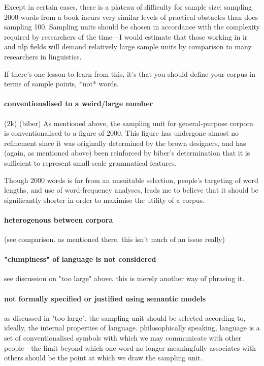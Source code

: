 Except in certain cases, there is a plateau of difficulty for sample size: sampling 2000 words from a book incurs very similar levels of practical obstacles than does sampling 100. Sampling units should be chosen in accordance with the complexity required by researchers of the time---I would estimate that those working in ir and nlp fields will demand relatively large sample units by comparison to many researchers in linguistics.

If there's one lesson to learn from this, it's that you should define your corpus in terms of sample points, *not* words.




\paragraph{conventionalised to a weird/large number}
(2k) (biber)
As mentioned above, the sampling unit for general-purpose corpora is conventionalised to a figure of 2000. This figure has undergone almost no refinement since it was originally determined by the brown designers, and has (again, as mentioned above) been reinforced by biber's determination that it is sufficient to represent small-scale grammatical features.

Though 2000 words is far from an unsuitable selection, people's targeting of word lengths, and use of word-frequency analyses, leads me to believe that it should be significantly shorter in order to maximise the utility of a corpus.



\paragraph{heterogenous between corpora }
(see comparison.  as mentioned there, this isn't much of an issue really)



\paragraph{"clumpiness" of language is not considered}
see discussion on "too large" above.  this is merely another way of phrasing it.


\paragraph{not formally specified or justified using semantic models}
as discussed in "too large", the sampling unit should be selected according to, ideally, the internal properties of language.  philosophically speaking, language is a set of conventionalised symbols with which we may communicate with other people---the limit beyond which one word no longer meaningfully associates with others should be the point at which we draw the sampling unit.

